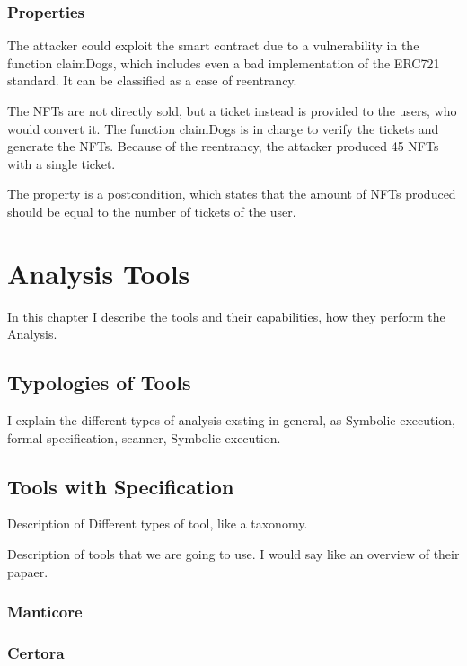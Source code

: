 \subsection{Properties}
\label{sec:DirtyDogs:Properties}
The attacker could exploit the smart contract due to a vulnerability in the function claimDogs, 
which includes even a bad implementation of the ERC721 standard. It can be classified as a case of reentrancy. 

The NFTs are not directly sold, but a ticket instead is provided to the users, who would convert it. The function claimDogs 
is in charge to verify the tickets and generate the NFTs. Because of the reentrancy, the attacker produced 45 NFTs with a single ticket.

The property is a postcondition, which states that the amount of NFTs produced should be equal to the number of tickets of the user.


\chapter{Analysis Tools}
\label{ch:Tools}
In this chapter I describe the tools and their capabilities, how they perform the Analysis.

\section{Typologies of Tools}
\label{sec:Tools:Typologies}
I explain the different types of analysis exsting in general, as Symbolic execution, formal specification, scanner, Symbolic execution.

\section{Tools with Specification}
\label{sec:Tools:Specification}
Description of Different types of tool, like a taxonomy.

Description of tools that we are going to use. 
I would say like an overview of their papaer.

\subsection{Manticore}
\label{sec:Specification:Manticore}


\subsection{Certora}
\label{sec:Specification:Certora}


